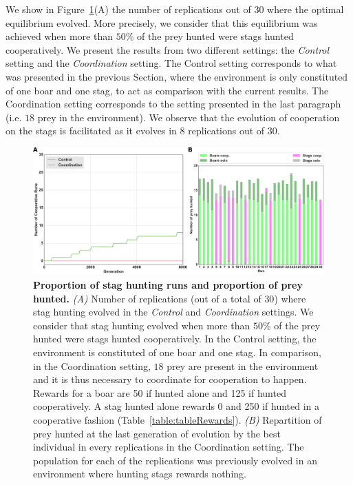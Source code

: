     We show in Figure~\ref{fig:figRecycling}(A) the number of replications out of $30$ where the optimal equilibrium evolved. More precisely, we consider that this equilibrium was achieved when more than \(50\%\) of the prey hunted were stags hunted cooperatively. We present the results from two different settings: the \emph{Control} setting and the \emph{Coordination} setting. The Control setting corresponds to what was presented in the previous Section, where the environment is only constituted of one boar and one stag, to act as comparison with the current results. The Coordination setting corresponds to the setting presented in the last paragraph (i.e. $18$ prey in the environment). We observe that the evolution of cooperation on the stags is facilitated as it evolves in $8$ replications out of $30$. 



    \begin{figure}[h]
      \centering
        \includegraphics[width=1\linewidth]{fig/ArticleBio2/Fig2.png}
        \caption{\textbf{Proportion of stag hunting runs and proportion of prey hunted.}
        \emph{(A)} Number of replications (out of a total of $30$) where stag hunting evolved in the \emph{Control} and \emph{Coordination} settings. We consider that stag hunting evolved when more than $50\%$ of the prey hunted were stags hunted cooperatively. In the Control setting, the environment is constituted of one boar and one stag. In comparison, in the Coordination setting, $18$ prey are present in the environment and it is thus necessary to coordinate for cooperation to happen. Rewards for a boar are 50 if hunted alone and 125 if hunted cooperatively. A stag hunted alone rewards 0 and 250 if hunted in a cooperative fashion (Table~\ref{table:tableRewards}). \emph{(B)} Repartition of prey hunted at the last generation of evolution by the best individual in every replications in the Coordination setting. The population for each of the replications was previously evolved in an environment where hunting stags rewards nothing.}
      \label{fig:figRecycling}
    \end{figure}

